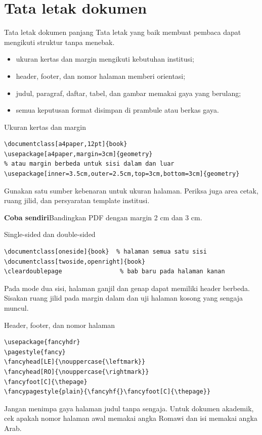 \documentclass[aspectratio=169,11pt]{beamer}
\newcommand{\tugas}[1]{\par\medskip\alert{\textbf{Coba sendiri}}\quad #1}
\begin{document}
\section{Tata letak dokumen}
\begin{frame}{Tata letak dokumen panjang}
Tata letak yang baik membuat pembaca dapat mengikuti struktur tanpa menebak.
\medskip
\begin{itemize}
\item ukuran kertas dan margin mengikuti kebutuhan institusi;
\item header, footer, dan nomor halaman memberi orientasi;
\item judul, paragraf, daftar, tabel, dan gambar memakai gaya yang berulang;
\item semua keputusan format disimpan di prambule atau berkas gaya.
\end{itemize}
\end{frame}
\begin{frame}[fragile]{Ukuran kertas dan margin}
\begin{lstlisting}
\documentclass[a4paper,12pt]{book}
\usepackage[a4paper,margin=3cm]{geometry}
% atau margin berbeda untuk sisi dalam dan luar
\usepackage[inner=3.5cm,outer=2.5cm,top=3cm,bottom=3cm]{geometry}
\end{lstlisting}
Gunakan satu sumber kebenaran untuk ukuran halaman. Periksa juga area cetak,
ruang jilid, dan persyaratan template institusi.
\tugas{Bandingkan PDF dengan margin 2 cm dan 3 cm.}
\end{frame}
\begin{frame}[fragile]{Single-sided dan double-sided}
\begin{lstlisting}
\documentclass[oneside]{book}  % halaman semua satu sisi
\documentclass[twoside,openright]{book}
\cleardoublepage                % bab baru pada halaman kanan
\end{lstlisting}
Pada mode dua sisi, halaman ganjil dan genap dapat memiliki header berbeda.
Sisakan ruang jilid pada margin dalam dan uji halaman kosong yang sengaja muncul.
\end{frame}
\begin{frame}[fragile]{Header, footer, dan nomor halaman}
\begin{lstlisting}
\usepackage{fancyhdr}
\pagestyle{fancy}
\fancyhead[LE]{\nouppercase{\leftmark}}
\fancyhead[RO]{\nouppercase{\rightmark}}
\fancyfoot[C]{\thepage}
\fancypagestyle{plain}{\fancyhf{}\fancyfoot[C]{\thepage}}
\end{lstlisting}
Jangan menimpa gaya halaman judul tanpa sengaja. Untuk dokumen akademik,
cek apakah nomor halaman awal memakai angka Romawi dan isi memakai angka Arab.
\end{frame}
\end{document}
